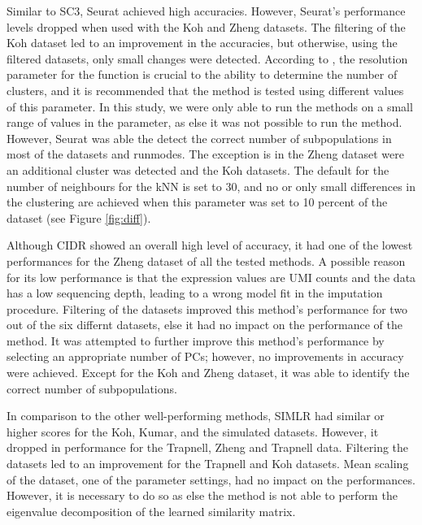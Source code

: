 \documentclass[12pt, a4paper]{article}\usepackage[]{graphicx}\usepackage[]{color}
\begin{document}
Similar to SC3, Seurat achieved high accuracies. However, Seurat’s performance levels dropped when used with the Koh and Zheng datasets. The filtering of the Koh dataset led to an improvement in the accuracies, but otherwise, using the filtered datasets, only small changes were detected. According to \citet{butler2017integrated}, the resolution parameter for the function is crucial to the ability to determine the number of clusters, and it is recommended that the method is tested using different values of this parameter. In this study, we were only able to run the methods on a small range of values in the parameter, as else it was not possible to run the method. However, Seurat was able the detect the correct number of subpopulations in most of the datasets and runmodes. The exception is in the Zheng dataset were an additional cluster was detected and the Koh datasets.  The default for the number of neighbours for the kNN is set to 30, and no or only small differences in the clustering are achieved when this parameter was set to 10 percent of the dataset (see Figure \ref{fig:diff}). 

Although CIDR showed an overall high level of accuracy, it had one of the lowest performances for the Zheng dataset of all the tested methods. A possible reason for its low performance is that the expression values are UMI counts and the data has a low sequencing depth, leading to a wrong model fit in the imputation procedure. Filtering of the datasets improved this method’s performance for two out of the six differnt datasets, else it had no impact on the performance of the method. It was attempted to further improve this method’s performance by selecting an appropriate number of PCs; however, no improvements in accuracy were achieved. 
Except for the Koh and  Zheng dataset, it was able to identify the correct number of subpopulations.


In comparison to the other well-performing methods, SIMLR had similar or higher scores for the Koh, Kumar,  and the simulated datasets. However, it dropped in performance for the Trapnell, Zheng and Trapnell data. 
Filtering the datasets led to an improvement for the Trapnell and Koh datasets. Mean scaling of the dataset, one of the parameter settings,  had no impact on the performances. However, it is necessary to do so as else the method is not able to perform the eigenvalue decomposition of the learned similarity matrix. 
\end{document}

